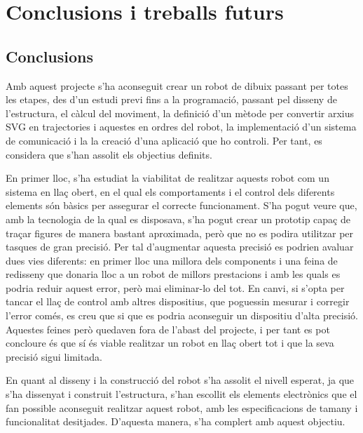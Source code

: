 \setlength\topmargin{8mm}
\onehalfspacing
\chapter{Conclusions i treballs futurs} %

\label{Chapter9} %




\section{Conclusions}

Amb aquest projecte s'ha aconseguit crear un robot de dibuix passant per totes les etapes, des d'un estudi previ fins a la programació, passant pel disseny de l'estructura, el càlcul del moviment, la definició d'un mètode per convertir arxius SVG en trajectories i aquestes en ordres del robot, la implementació d'un sistema de comunicació i la la creació d'una aplicació que ho controli. Per tant, es considera que s'han assolit els objectius definits.

En primer lloc, s'ha estudiat la viabilitat de realitzar aquests robot com un sistema en llaç obert, en el qual els comportaments i el control dels diferents elements són bàsics per assegurar el correcte funcionament. S'ha pogut veure que, amb la tecnologia de la qual es disposava, s'ha pogut crear un prototip capaç de traçar figures de manera bastant aproximada, però que no es podira utilitzar per tasques de gran precisió. Per tal d'augmentar aquesta precisió es podrien avaluar dues vies diferents: en primer lloc una millora dels components i una feina de redisseny que donaria lloc a un robot de millors prestacions i amb les quals es podria reduir aquest error, però mai eliminar-lo del tot. En canvi, si s'opta per tancar el llaç de control amb altres dispositius, que poguessin mesurar i corregir l'error comés, es creu que si que es podria aconseguir un dispositiu d'alta precisió. Aquestes feines però quedaven fora de l'abast del projecte, i per tant es pot concloure és que sí és viable realitzar un robot en llaç obert tot i que la seva precisió sigui limitada. 

En quant al disseny i la construcció del robot s'ha assolit el nivell esperat, ja que s'ha dissenyat i construit l'estructura, s'han escollit els elements electrònics que el fan possible aconseguit realitzar aquest robot, amb les especificacions de tamany i funcionalitat desitjades. D'aquesta manera, s'ha complert amb aquest objectiu.

